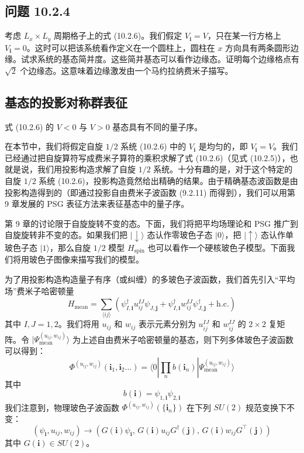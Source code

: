 \subsection*{问题 10.2.4}

考虑 $L_x\times L_y$ 周期格子上的式 (10.2.6)。我们假定 $V_{\pmb{i}}=V$，只在某一行方格上 $V_{\pmb{i}}=0$。这时可以把该系统看作定义在一个圆柱上，圆柱在 $x$ 方向具有两条圆形边缘。试求系统的基态简并度。这些简并基态可以看作边缘态。证明每个边缘格点有 $\sqrt{2}$ 个边缘态。这意味着边缘激发由一个马约拉纳费米子描写。

\subsection{基态的投影对称群表征}

\begin{keypoints}
\item 式 (10.2.6) 的 $V<0$ 与 $V>0$ 基态具有不同的量子序。
\end{keypoints}

在本节中，我们将假定自旋 $1/2$ 系统 (10.2.6) 中的 $V_{\pmb{i}}$ 是均匀的，即 $V_{\pmb{i}}=V$。我们已经通过把自旋算符写成费米子算符的乘积求解了式 (10.2.6)（见式 (10.2.5)），也就是说，我们用投影构造求解了自旋 $1/2$ 系统。十分有趣的是，对于这个特定的自旋 $1/2$ 系统 (10.2.6)，投影构造竟然给出精确的结果。由于精确基态波函数是由投影构造得到的（即通过投影自由费米子波函数 (9.2.11) 而得到），我们可以用第 9 章发展的 PSG 表征方法来表征基态中的量子序。

第 9 章的讨论限于自旋旋转不变的态。下面，我们将把平均场理论和 PSG 推广到自旋旋转非不变的态。如果我们把 $|\downarrow\rangle$ 态认作零玻色子态 $|0\rangle$，把 $|\uparrow\rangle$ 态认作单玻色子态 $|1\rangle$，那么自旋 $1/2$ 模型 $H_{\text{spin}}$ 也可以看作一个硬核玻色子模型。下面我们将用玻色子图像来描写我们的模型。

为了用投影构造构造量子有序（或纠缠）的多玻色子波函数，我们首先引入“平均场”费米子哈密顿量
\begin{equation*}
H_{\text{mean}}=\sum_{\langle ij\rangle}\left(\psi^{\dagger}_{I,\pmb{i}}u_{ij}^{IJ}\psi_{J,\pmb{j}}+\psi^{\dagger}_{I,\pmb{i}}w_{ij}^{IJ}\psi^{\dagger}_{J,\pmb{j}}+\text{h.c.}\right)
\tag{10.2.9}
\end{equation*}
其中 $I,J=1,2$。我们将用 $u_{ij}$ 和 $w_{ij}$ 表示元素分别为 $u_{ij}^{IJ}$ 和 $w_{ij}^{IJ}$ 的 $2\times2$ 复矩阵。令 $|\Psi^{(u_{ij},w_{ij})}_{\text{mean}}\rangle$ 为上述自由费米子哈密顿量的基态，则下列多体玻色子波函数可以得到：
\begin{equation*}
\Phi^{(u_{ij},w_{ij})}(\pmb{i}_1,\pmb{i}_2...)=\langle0|\prod_{n}b(\pmb{i}_n)|\Psi^{(u_{ij},w_{ij})}_{\text{mean}}\rangle
\tag{10.2.10}
\end{equation*}
其中
\begin{equation*}
b(\pmb{i})=\psi_{1,\pmb{i}}\psi_{2,\pmb{i}}
\tag{10.2.11}
\end{equation*}
我们注意到，物理玻色子波函数 $\Phi^{(u_{ij},w_{ij})}(\{\pmb{i}_n\})$ 在下列 $SU(2)$ 规范变换下不变：
\begin{equation*}
(\psi_{\pmb{i}},u_{ij},w_{ij})\to(G(\pmb{i})\psi_{\pmb{i}},\,G(\pmb{i})u_{ij}G^{\dagger}(\pmb{j}),\,G(\pmb{i})w_{ij}G^{\top}(\pmb{j}))
\end{equation*}
其中 $G(\pmb{i})\in SU(2)$。

